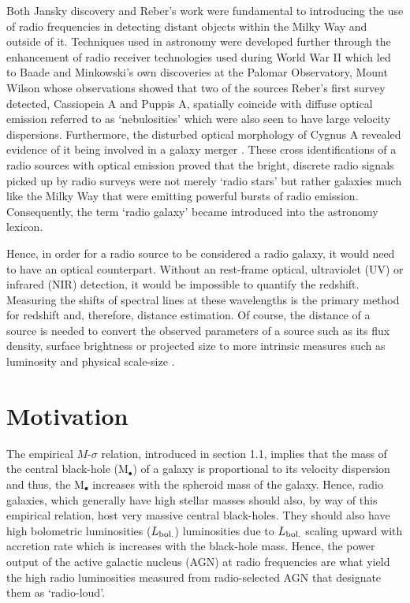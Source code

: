 \documentclass[10pt,a4paper]{article}
\begin{document}
Both Jansky discovery and Reber's work were fundamental to introducing the use of radio frequencies in detecting distant objects within the Milky Way and outside of it. Techniques used in astronomy were developed further through the enhancement of radio receiver technologies used during World War II which led to Baade and Minkowski's own discoveries at the Palomar Observatory, Mount Wilson whose observations showed that two of the sources Reber's first survey detected, Cassiopeia A and Puppis A, spatially coincide with diffuse optical emission referred to as `nebulosities' which were also seen to have large velocity dispersions. Furthermore, the disturbed optical morphology of Cygnus A revealed evidence of it being involved in a galaxy merger \citep{BaadeMinkowski1954}. These cross identifications of a radio sources with optical emission proved that the bright, discrete radio signals picked up by radio surveys were not merely `radio stars' but rather galaxies much like the Milky Way that were emitting powerful bursts of radio emission. Consequently, the term `radio galaxy' became introduced into the astronomy lexicon. 

Hence, in order for a radio source to be considered a radio galaxy, it would need to have an optical counterpart. Without an rest-frame optical, ultraviolet (UV) or infrared (NIR) detection, it would be impossible to quantify the redshift. Measuring the shifts of spectral lines at these wavelengths is the primary method for redshift and, therefore, distance estimation. Of course, the distance of a source is needed to convert the observed parameters of a source such as its flux density, surface brightness or projected size to more intrinsic measures such as luminosity and physical scale-size \citep{Moffet1966}. 



\section{Motivation}\label{section:motivation}
The empirical $M$-$\sigma$ relation, introduced in section 1.1, implies that the mass of the central black-hole (M$_\bullet$) of a galaxy is proportional to its velocity dispersion and thus, the M$_\bullet$ increases with the spheroid mass of the galaxy. Hence, radio galaxies, which generally have high stellar masses should also, by way of this empirical relation, host very massive central black-holes. They should also have high bolometric luminosities ($L_{\rm bol.}$) luminosities due to $L_{\rm bol.}$ scaling upward with accretion rate which is increases with the black-hole mass. Hence, the power output of the active galactic nucleus (AGN) at radio frequencies are what yield the high radio luminosities measured from radio-selected AGN that designate them as `radio-loud'. 
\end{document}

